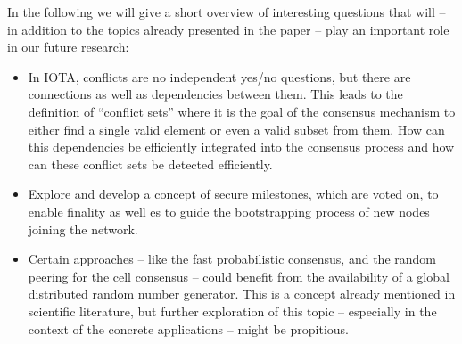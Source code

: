 \documentclass[../main.tex]{subfiles}
\begin{document}
In the following we will give a short overview of interesting questions that will -- in addition to the topics already presented in the paper -- play an important role in our future research:

\begin{itemize}
    \item In IOTA, conflicts are no independent yes/no questions, but there are connections as well as dependencies between them. This leads to the definition of \enquote{conflict sets} where it is the goal of the consensus mechanism to either find a single valid element or even a valid subset from them.
    How can this dependencies be efficiently integrated into the consensus process and how can these conflict sets be detected efficiently.
    
    \item Explore and develop a concept of secure milestones, which are voted on, to enable finality as well es to guide the bootstrapping process of new nodes joining the network.
    
    \item Certain approaches -- like the fast probabilistic consensus, and the random peering for the cell consensus -- could benefit from the availability of a global distributed random number generator.
    This is a concept already mentioned in scientific literature, but further exploration of this topic -- especially in the context of the concrete applications -- might be propitious. 
    
    
\end{itemize}
\end{document}
